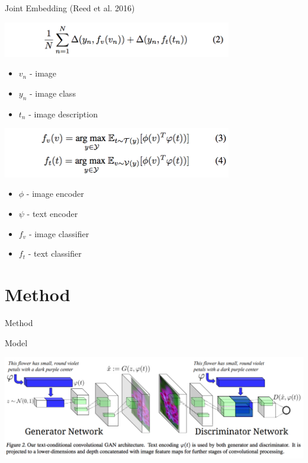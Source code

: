 \documentclass{beamer}
\begin{document}
\begin{frame}{Joint Embedding (Reed et al. 2016)}

\begin{center}
\includegraphics[width=10cm]{img/reed/joint.png}
\end{center}

\begin{itemize}
\item $v_n$ - image
\item $y_n$ - image class
\item $t_n$ - image description
\end{itemize}

\begin{center}
\includegraphics[width=10cm]{img/reed/classifiers.png}
\end{center}

\begin{itemize}
\item $\phi$ - image encoder
\item $\psi$ - text encoder
\item $f_v$ - image classifier
\item $f_t$ - text classifier

\end{itemize}
\end{frame}


\section{Method}
\begin{frame}{}
\centering
Method
\end{frame}


\begin{frame}{Model}

\includegraphics[width=1.0\linewidth]{img/reed/model.png}

\end{frame}
\end{document}

